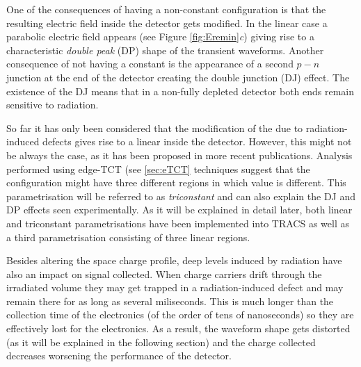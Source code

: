 
One of the consequences of having a non-constant \neff configuration is that the resulting electric field inside the detector gets modified. In the linear case a parabolic electric field appears (see Figure \ref{fig:Eremin}\emph{c}) giving rise to a characteristic \emph{double peak} (DP) shape of the transient waveforms. Another consequence of not having a constant \neff is the appearance of a second $p-n$ junction at the end of the detector creating the double junction (DJ) effect. The existence of the DJ means that in a non-fully depleted detector both ends remain sensitive to radiation.



So far it has only been considered that the modification of the \neff due to radiation-induced defects gives rise to a linear \neff inside the detector. However, this might not be always the case, as it has been proposed in more recent publications\cite{KramVertex}. Analysis performed using edge-TCT (see \ref{sec:eTCT} techniques suggest that the \neff configuration might have three different regions in which \neff value is different. This parametrisation will be referred to as \emph{triconstant} and can also explain the DJ and DP effects seen experimentally. As it will be explained in detail later, both linear and triconstant parametrisations have been implemented into TRACS as well as a third parametrisation consisting of three linear regions.  

Besides altering the space charge profile, deep levels induced by radiation have also an impact on signal collected. When charge carriers drift through the irradiated volume they may get trapped in a radiation-induced defect and may remain there for as long as several miliseconds. This is much longer than the collection time of the electronics (of the order of tens of nanoseconds) so they are effectively lost for the electronics. As a result, the waveform shape gets distorted (as it will be explained in the following section) and the charge collected decreases worsening the performance of the detector.

